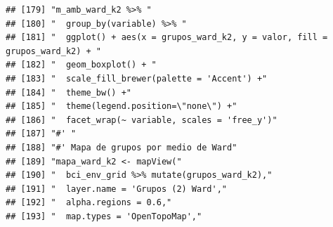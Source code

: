 \documentclass[11pt,]{article}
\begin{document}
\begin{verbatim}
## [179] "m_amb_ward_k2 %>% "                                                                                                                                                    
## [180] "  group_by(variable) %>% "                                                                                                                                             
## [181] "  ggplot() + aes(x = grupos_ward_k2, y = valor, fill = grupos_ward_k2) + "                                                                                             
## [182] "  geom_boxplot() + "                                                                                                                                                   
## [183] "  scale_fill_brewer(palette = 'Accent') +"                                                                                                                             
## [184] "  theme_bw() +"                                                                                                                                                        
## [185] "  theme(legend.position=\"none\") +"                                                                                                                                   
## [186] "  facet_wrap(~ variable, scales = 'free_y')"                                                                                                                           
## [187] "#' "                                                                                                                                                                   
## [188] "#' Mapa de grupos por medio de Ward"                                                                                                                                   
## [189] "mapa_ward_k2 <- mapView("                                                                                                                                              
## [190] "  bci_env_grid %>% mutate(grupos_ward_k2),"                                                                                                                            
## [191] "  layer.name = 'Grupos (2) Ward',"                                                                                                                                     
## [192] "  alpha.regions = 0.6,"                                                                                                                                                
## [193] "  map.types = 'OpenTopoMap',"                                                                                                                                          

\end{verbatim}
\end{document}
